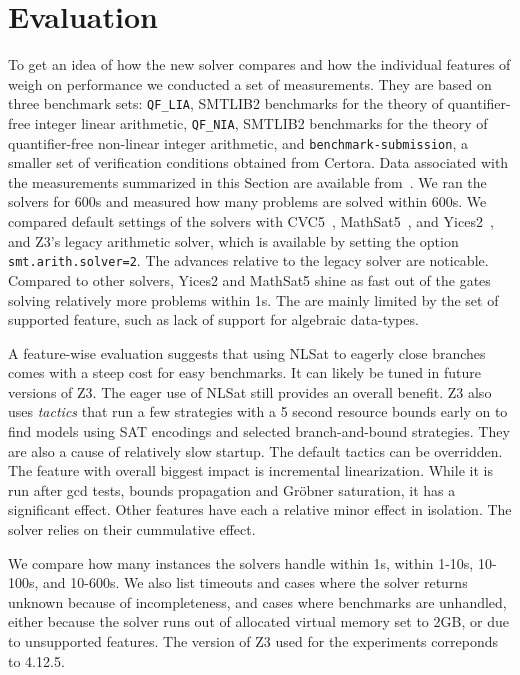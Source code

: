 \section{Evaluation}
\label{sec:eval}

To get an idea of how the new solver compares and how the individual features of weigh on performance
we conducted a set of measurements. They are based on three benchmark sets: {\tt QF\_LIA}, SMTLIB2 benchmarks for the theory of quantifier-free integer linear arithmetic,
{\tt QF\_NIA}, SMTLIB2 benchmarks for the theory of quantifier-free non-linear integer arithmetic, and {\tt benchmark-submission}, a smaller set of verification
conditions obtained from Certora.
Data associated with the measurements summarized in this Section are available from~\cite{z3data}.
We ran the solvers for 600s and measured how many problems are solved within 600s.
We compared default settings of the solvers
with CVC5~\cite{DBLP:conf/tacas/BarbosaBBKLMMMN22,DBLP:conf/cade/KremerRBT22,cvc5tool},
MathSat5~\cite{DBLP:conf/tacas/CimattiGSS13,mathsattool}, and Yices2~\cite{DBLP:conf/cav/Dutertre14,yicestool}, and Z3's legacy arithmetic solver,
which is available by setting the option {\tt smt.arith.solver=2}. The advances relative to the legacy solver are noticable. Compared to other solvers,
Yices2 and MathSat5 shine as fast out of the gates solving relatively more problems within 1s.
The are mainly limited by the set of supported feature, such as lack of support for algebraic data-types.

A feature-wise evaluation suggests that using NLSat to eagerly close branches comes with a steep cost for easy benchmarks.
It can likely be tuned in future versions of Z3. The eager use of NLSat still provides an overall benefit. Z3 also uses \emph{tactics} that run
a few strategies with a 5 second resource bounds early on to find models using SAT encodings and selected branch-and-bound strategies. They are also
a cause of relatively slow startup. The default tactics can be overridden. The feature with overall biggest impact is incremental
linearization. While it is run after gcd tests, bounds propagation and Gr{\"o}bner saturation, it has a significant effect.
Other features have each a relative minor effect in isolation. The solver relies on their cummulative effect.

We compare how many instances the solvers handle within
1s, within 1-10s, 10-100s, and 10-600s. We also list
timeouts and cases where the solver returns unknown because of incompleteness,
and cases where benchmarks are unhandled, either because the solver runs out of allocated virtual memory set to 2GB,
or due to unsupported features. The version of Z3 used for the experiments correponds to 4.12.5.


